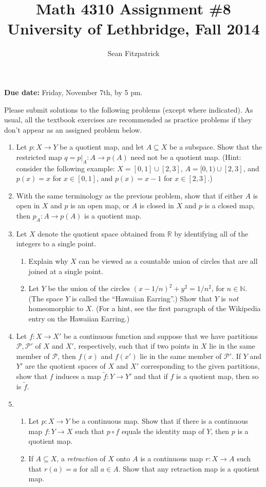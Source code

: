 \documentclass[letterpaper,12pt]{article}
\title{Math 4310 Assignment \#8\\University of Lethbridge, Fall 2014}
\author{Sean Fitzpatrick}
\newcommand{\R}{\mathbb{R}}
\newcommand{\N}{\mathbb{N}}
\begin{document}
 \maketitle

{\bf Due date:} Friday, November 7th, by 5 pm.

\bigskip

Please submit solutions to the following problems (except where indicated). As usual, all the textbook exercises are recommended as practice problems if they don't appear as an assigned problem below.

\begin{enumerate}
\item Let $p:X\to Y$ be a quotient map, and let $A\subseteq X$ be a subspace. Show that the restricted map $q=p|_A:A\to p(A)$ need not be a quotient map. (Hint: consider the following example: $X=[0,1]\cup [2,3]$, $A=[0,1)\cup [2,3]$, and $p(x)=x$ for $x\in [0,1]$, and $p(x)=x-1$ for $x\in [2,3]$.)
\item With the same terminology as the previous problem, show that if either $A$ is open in $X$ and $p$ is an open map, or $A$ is closed in $X$ and $p$ is a closed map, then $p_A:A\to p(A)$ is a quotient map.
\item Let $X$ denote the quotient space obtained from $\R$ by identifying all of the integers to a single point.
\begin{enumerate}
 \item Explain why $X$ can be viewed as a countable union of circles that are all joined at a single point.
 \item Let $Y$ be the union of the circles $(x-1/n)^2+y^2=1/n^2$, for $n\in \N$. (The space $Y$ is called the ``Hawaiian Earring''.) Show that $Y$ is {\em not} homeomorphic to $X$. (For a hint, see the first paragraph of the Wikipedia entry on the Hawaiian Earring.)
\end{enumerate}
 \item Let $f:X\to X'$ be a continuous function and suppose that we have partitions $\mathcal{P},\mathcal{P}'$ of $X$ and $X'$, respectively, such that if two points in $X$ lie in the same member of $\mathcal{P}$, then $f(x)$ and $f(x')$ lie in the same member of $\mathcal{P}'$. If $Y$ and $Y'$ are the quotient spaces of $X$ and $X'$ corresponding to the given partitions, show that $f$ induces a map $\tilde{f}:Y\to Y'$ and that if $f$ is a quotient map, then so is $\tilde{f}$.
 \item \begin{enumerate}
        \item Let $p:X\to Y$ be a continuous map. Show that if there is a continuous map $f:Y\to X$ such that $p\circ f$ equals the identity map of $Y$, then $p$ is a quotient map.
        \item If $A\subseteq X$, a {\em retraction} of $X$ onto $A$ is a continuous map $r:X\to A$ such that $r(a)=a$ for all $a\in A$. Show that any retraction map is a quotient map.
       \end{enumerate}

\end{enumerate}
\end{document}
